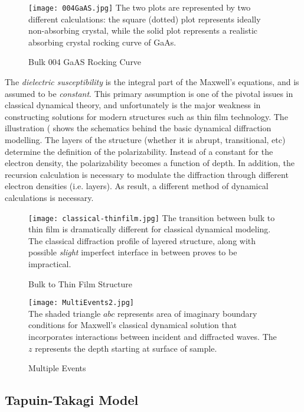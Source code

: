 \begin{figure}[h]
\caption{Bulk 004 GaAS Rocking Curve \cite{Authier1}}
\label{GaAs004}
\texttt{[image: 004GaAS.jpg]}
The two plots are represented by two different calculations:  the square (dotted) plot represents ideally non-absorbing crystal, while the solid plot represents a realistic absorbing crystal rocking curve of GaAs.
\end{figure}

  The \emph{dielectric susceptibility} is the integral part of the Maxwell's equations, and is assumed to be \emph{constant}.  This primary assumption is one of the pivotal issues in classical dynamical theory, and unfortunately is the major weakness in constructing solutions for modern structures such as thin film technology.  The illustration ( shows the schematics behind the basic dynamical diffraction modelling.  The layers of the structure (whether it is abrupt, transitional, etc) determine the definition of the polarizability.   Instead of a constant for the electron density, the polarizability becomes a function of depth.  In addition, the recursion calculation is necessary to modulate the diffraction through different electron densities (i.e. layers).  As result, a different method of dynamical calculations is necessary.
\begin{figure}[h]
\caption{Bulk to Thin Film Structure}
\label{clas-tf}
\texttt{[image: classical-thinfilm.jpg]}
The transition between bulk to thin film is dramatically different for classical dynamical modeling.  The classical diffraction profile of layered structure, along with possible \emph{slight} imperfect interface in between proves to be impractical.
\end{figure}


\begin{figure}[h]
\caption{Multiple Events}
\label{MultiEvent}
\texttt{[image: MultiEvents2.jpg]}\\
The shaded triangle $abc$ represents area of imaginary boundary conditions for Maxwell's classical dynamical solution that incorporates interactions between incident and diffracted waves.  The $z$ represents the depth starting at surface of sample.
\end{figure}


	\subsection{Tapuin-Takagi Model}

